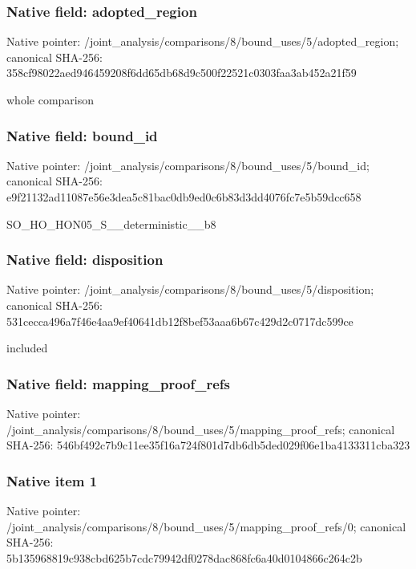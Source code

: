 \documentclass[10pt,a4paper]{article}
\begin{document}
\subsubsection{Native field: adopted\_\allowbreak{}region}
Native pointer: /joint\_\allowbreak{}analysis/comparisons/8/bound\_\allowbreak{}uses/5/adopted\_\allowbreak{}region; canonical SHA-256: 358cf98022aed946459208f6dd65db68d9c500f22521c0303faa3ab452a21f59

\begingroup\raggedright\sloppy whole comparison\par\endgroup

\subsubsection{Native field: bound\_\allowbreak{}id}
Native pointer: /joint\_\allowbreak{}analysis/comparisons/8/bound\_\allowbreak{}uses/5/bound\_\allowbreak{}id; canonical SHA-256: e9f21132ad11087e56e3dea5c81bac0db9ed0c6b83d3dd4076fc7e5b59dcc658

\begingroup\raggedright\sloppy SO\_\allowbreak{}HO\_\allowbreak{}HON05\_\allowbreak{}S\_\allowbreak{}\_\allowbreak{}deterministic\_\allowbreak{}\_\allowbreak{}b8\par\endgroup

\subsubsection{Native field: disposition}
Native pointer: /joint\_\allowbreak{}analysis/comparisons/8/bound\_\allowbreak{}uses/5/disposition; canonical SHA-256: 531cecca496a7f46e4aa9ef40641db12f8bef53aaa6b67c429d2c0717dc599ce

\begingroup\raggedright\sloppy included\par\endgroup

\subsubsection{Native field: mapping\_\allowbreak{}proof\_\allowbreak{}refs}
Native pointer: /joint\_\allowbreak{}analysis/comparisons/8/bound\_\allowbreak{}uses/5/mapping\_\allowbreak{}proof\_\allowbreak{}refs; canonical SHA-256: 546bf492c7b9c11ee35f16a724f801d7db6db5ded029f06e1ba4133311cba323

\subsubsection{Native item 1}
Native pointer: /joint\_\allowbreak{}analysis/comparisons/8/bound\_\allowbreak{}uses/5/mapping\_\allowbreak{}proof\_\allowbreak{}refs/0; canonical SHA-256: 5b135968819c938cbd625b7cdc79942df0278dac868fc6a40d0104866c264c2b
\end{document}
